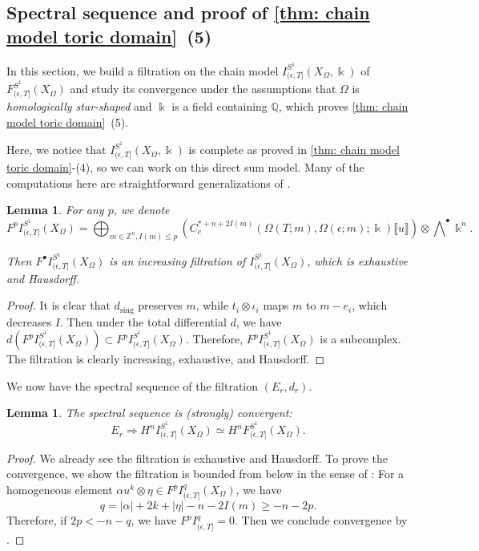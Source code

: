 \documentclass[11pt]{amsart}
\numberwithin{equation}{section}
\theoremstyle{plain}
\newtheorem{Lemma}[lemma]{Lemma}
\theoremstyle{definition}
\theoremstyle{remark}
\newcommand{\bQ} { {\mathbb{Q}}}
\newcommand{\bZ} { {\mathbb{Z}}}
\newcommand{\fpw}[1]{{\llbracket #1\rrbracket}}
\begin{document}
\subsection{Spectral sequence and proof of \autoref{thm: chain model toric domain}~(5)}\label{subsection: spectral sequence}
In this section, we build a filtration on the chain model $I_{(\epsilon,T]}^{S^1}(X_\Omega,\Bbbk)$ of $F_{(\epsilon,T]}^{S^1}(X_\Omega)$ and study its convergence under the assumptions that $\Omega$ is \textit{homologically star-shaped} and $ \Bbbk$ is a field containing $\bQ$, which proves \autoref{thm: chain model toric domain}~(5).

Here, we notice that $I_{(\epsilon,T]}^{S^1}(X_\Omega,\Bbbk)$ is complete as proved in \autoref{thm: chain model toric domain}-(4), so we can work on this direct sum model. Many of the computations here are straightforward generalizations of \cite{Irie_ChainModel}.  

\begin{Lemma}For any $p$, we denote
\[F^pI_{(\epsilon,T]}^{S^1}(X_\Omega)= \bigoplus_{m\in \bZ^n,I(m)\leq p}\left( C^{*+n+2I(m)}_c({\Omega(T;m)},\Omega(\epsilon;m) ;\Bbbk )\fpw{u} \right)\otimes \bigwedge\nolimits^\bullet \Bbbk ^n.\]

Then $F^\bullet I_{(\epsilon,T]}^{S^1}(X_\Omega)$ is an increasing filtration of $I_{(\epsilon,T]}^{S^1}(X_\Omega)$, which is exhaustive and Hausdorff.    
\end{Lemma}
\begin{proof}It is clear that $d_{\mathrm{sing}}$ preserves $m$, while $t_i\otimes \iota_i$ maps $m$ to $m-e_i$, which decreases $I$. Then under the total differential $d$, we have $d (F^p I_{(\epsilon,T]}^{S^1}(X_\Omega))\subset  F^p I_{(\epsilon,T]}^{S^1}(X_\Omega)$. Therefore, $F^p I_{(\epsilon,T]}^{S^1}(X_\Omega)$ is a subcomplex. 
The filtration is clearly increasing, exhaustive, and Hausdorff.    
\end{proof}
We now have the spectral sequence of the filtration $(E_r,d_r)$.
\begin{Lemma}The spectral sequence is (strongly) convergent:
\[E_r\Rightarrow H^nI_{(\epsilon,T]}^{S^1}(X_\Omega)\simeq H^nF^{S^1}_{(\epsilon,T]}(X_\Omega).\]
\end{Lemma}
\begin{proof}We already see the filtration is exhaustive and Hausdorff. To prove the convergence, we show the filtration is bounded from below in the sense of \cite[Definition~5.4.2(2)]{Weibel1994}: For a homogeneous element $\alpha u^k\otimes \eta\in F^pI^q_{(\epsilon,T]}(X_\Omega)$, we have
\[q=|\alpha|+2k+|\eta|-n-2I(m)\geq  -n-2p.\]
Therefore, if $2p<-n-q$, we have $F^pI^q_{(\epsilon,T]}=0$. Then we conclude convergence by \cite[Theorem~5.5.1(2)]{Weibel1994}.
\end{proof}
\end{document}
